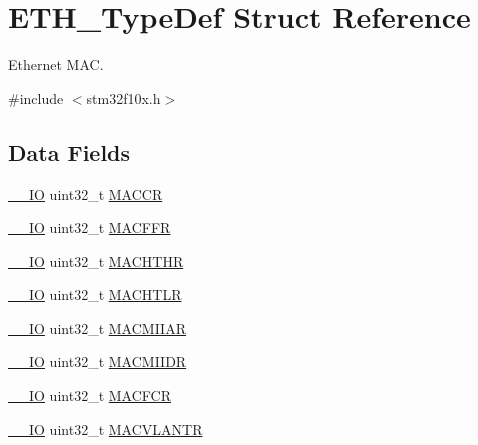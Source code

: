 \hypertarget{struct_e_t_h___type_def}{}\section{E\+T\+H\+\_\+\+Type\+Def Struct Reference}
\label{struct_e_t_h___type_def}


Ethernet M\+AC.  




{\ttfamily \#include $<$stm32f10x.\+h$>$}

\subsection*{Data Fields}
\begin{DoxyCompactItemize}
\item 
\mbox{\hyperlink{core__sc300_8h_aec43007d9998a0a0e01faede4133d6be}{\+\_\+\+\_\+\+IO}} uint32\+\_\+t \mbox{\hyperlink{struct_e_t_h___type_def_a20acbcac1c35f66de94c9ff0e2ddc7b0}{M\+A\+C\+CR}}
\item 
\mbox{\hyperlink{core__sc300_8h_aec43007d9998a0a0e01faede4133d6be}{\+\_\+\+\_\+\+IO}} uint32\+\_\+t \mbox{\hyperlink{struct_e_t_h___type_def_a8ad4e3dbde1518ecde5d979c2a89a76a}{M\+A\+C\+F\+FR}}
\item 
\mbox{\hyperlink{core__sc300_8h_aec43007d9998a0a0e01faede4133d6be}{\+\_\+\+\_\+\+IO}} uint32\+\_\+t \mbox{\hyperlink{struct_e_t_h___type_def_a121212bdb227106df681d24e5d896a4e}{M\+A\+C\+H\+T\+HR}}
\item 
\mbox{\hyperlink{core__sc300_8h_aec43007d9998a0a0e01faede4133d6be}{\+\_\+\+\_\+\+IO}} uint32\+\_\+t \mbox{\hyperlink{struct_e_t_h___type_def_a1d34ab8e5c2041c00ba9526b3958099d}{M\+A\+C\+H\+T\+LR}}
\item 
\mbox{\hyperlink{core__sc300_8h_aec43007d9998a0a0e01faede4133d6be}{\+\_\+\+\_\+\+IO}} uint32\+\_\+t \mbox{\hyperlink{struct_e_t_h___type_def_a9ea1e1c6615eb3bd70eb328dba65fc87}{M\+A\+C\+M\+I\+I\+AR}}
\item 
\mbox{\hyperlink{core__sc300_8h_aec43007d9998a0a0e01faede4133d6be}{\+\_\+\+\_\+\+IO}} uint32\+\_\+t \mbox{\hyperlink{struct_e_t_h___type_def_a87c7687c35332bf5ee86473043652146}{M\+A\+C\+M\+I\+I\+DR}}
\item 
\mbox{\hyperlink{core__sc300_8h_aec43007d9998a0a0e01faede4133d6be}{\+\_\+\+\_\+\+IO}} uint32\+\_\+t \mbox{\hyperlink{struct_e_t_h___type_def_a12f62d3d3b9ee30c20c324b146e72795}{M\+A\+C\+F\+CR}}
\item 
\mbox{\hyperlink{core__sc300_8h_aec43007d9998a0a0e01faede4133d6be}{\+\_\+\+\_\+\+IO}} uint32\+\_\+t \mbox{\hyperlink{struct_e_t_h___type_def_a92ff1fe799bb33d13efbaa1195867781}{M\+A\+C\+V\+L\+A\+N\+TR}}

\end{DoxyCompactItemize}
